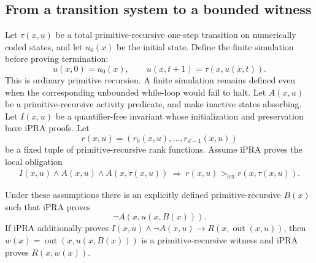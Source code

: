 \subsection{From a transition system to a bounded witness}

Let $\tau(x,u)$ be a total primitive-recursive one-step transition on
numerically coded states, and let $u_0(x)$ be the initial state.  Define
the finite simulation before proving termination:
\[
 u(x,0)=u_0(x),\qquad
 u(x,t+1)=\tau(x,u(x,t)).
\]
This is ordinary primitive recursion.  A finite simulation remains
defined even when the corresponding unbounded while-loop would fail to
halt.  Let $A(x,u)$ be a primitive-recursive activity predicate, and make
inactive states absorbing.  Let $I(x,u)$ be a quantifier-free invariant
whose initialization and preservation have iPRA proofs.  Let
\[
 r(x,u)=(r_0(x,u),\ldots,r_{d-1}(x,u))
\]
be a fixed tuple of primitive-recursive rank functions.  Assume iPRA
proves the local obligation
\begin{align*}
 I(x,u)\wedge A(x,u)\wedge A(x,\tau(x,u))
 \ \Longrightarrow\ 
 r(x,u)>_{\mathrm{lex}}r(x,\tau(x,u)).
\end{align*}

\begin{theorem}
\label{thm:automatic-lex-fuel}
Under these assumptions there is an explicitly defined
primitive-recursive $B(x)$ such that iPRA proves
\[
                         \neg A(x,u(x,B(x))).
\]
If iPRA additionally proves
$I(x,u)\wedge\neg A(x,u)\to R(x,\operatorname{out}(x,u))$,
then $w(x)=\operatorname{out}(x,u(x,B(x)))$ is a
primitive-recursive witness and iPRA proves $R(x,w(x))$.
\end{theorem}

